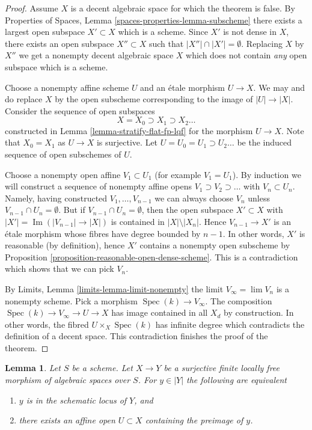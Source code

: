 \documentclass{stacks-project}
\theoremstyle{plain}
\newtheorem{lemma}[subsection]{Lemma}
\theoremstyle{definition}
\theoremstyle{remark}
\numberwithin{equation}{subsection}
\def\lim{\mathop{\mathrm{lim}}\nolimits}
\def\Spec{\mathop{\mathrm{Spec}}}
\def\Im{\mathop{\mathrm{Im}}}
\begin{document}
\begin{proof}
Assume $X$ is a decent algebraic space for which the theorem is false. By
Properties of Spaces, Lemma \ref{spaces-properties-lemma-subscheme}
there exists a largest open subspace $X' \subset X$ which is a scheme.
Since $X'$ is not dense in $X$, there exists an open subspace
$X'' \subset X$ such that $|X''| \cap |X'| = \emptyset$. Replacing $X$
by $X''$ we get a nonempty decent algebraic space $X$ which does not
contain {\it any} open subspace which is a scheme.

\medskip\noindent
Choose a nonempty affine scheme $U$ and an \'etale morphism $U \to X$.
We may and do replace $X$ by the open subscheme corresponding to the
image of $|U| \to |X|$. Consider the sequence of open subspaces
$$
X = X_0 \supset X_1 \supset X_2 \ldots
$$
constructed in Lemma \ref{lemma-stratify-flat-fp-lqf}
for the morphism $U \to X$. Note that $X_0 = X_1$ as $U \to X$
is surjective. Let $U = U_0 = U_1 \supset U_2 \ldots$ be the induced
sequence of open subschemes of $U$.

\medskip\noindent
Choose a nonempty open affine $V_1 \subset U_1$ (for example $V_1 = U_1$).
By induction we will construct a sequence of nonempty affine opens
$V_1 \supset V_2 \supset \ldots$ with $V_n \subset U_n$. Namely, having
constructed $V_1, \ldots, V_{n - 1}$ we can always choose $V_n$ unless
$V_{n - 1} \cap U_n = \emptyset$. But if $V_{n - 1} \cap U_n = \emptyset$,
then the open subspace $X' \subset X$ with
$|X'| = \Im(|V_{n - 1}| \to |X|)$ is contained in $|X| \setminus |X_n|$.
Hence $V_{n - 1} \to X'$ is an \'etale morphism whose fibres have degree
bounded by $n - 1$. In other words, $X'$ is reasonable (by definition),
hence $X'$ contains a nonempty open subscheme by
Proposition \ref{proposition-reasonable-open-dense-scheme}.
This is a contradiction which shows that we can pick $V_n$.

\medskip\noindent
By Limits, Lemma \ref{limits-lemma-limit-nonempty}
the limit $V_\infty = \lim V_n$ is a nonempty scheme. Pick a morphism
$\Spec(k) \to V_\infty$. The composition $\Spec(k) \to V_\infty \to U \to X$
has image contained in all $X_d$ by construction. In other words, the
fibred $U \times_X \Spec(k)$ has infinite degree which contradicts
the definition of a decent space. This contradiction finishes the proof
of the theorem.
\end{proof}

\begin{lemma}
\label{lemma-when-quotient-scheme-at-point}
Let $S$ be a scheme. Let $X \to Y$ be a surjective finite locally free
morphism of algebraic spaces over $S$. For $y \in |Y|$ the following are
equivalent
\begin{enumerate}
\item $y$ is in the schematic locus of $Y$, and
\item there exists an affine open $U \subset X$
containing the preimage of $y$.
\end{enumerate}
\end{lemma}
\end{document}
